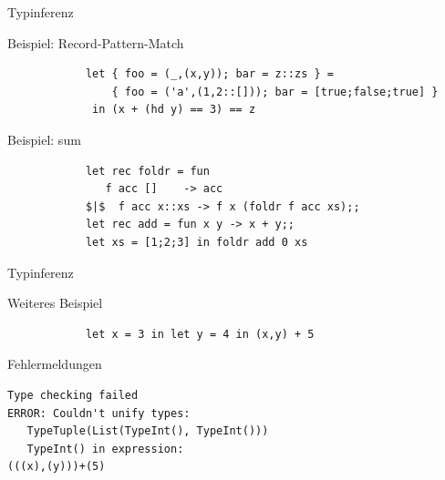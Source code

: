 \documentclass[hyperref={pdfpagelabels=false}]{beamer}
\begin{document}
\begin{frame}[fragile]{Typinferenz}
  \begin{block}{Beispiel: Record-Pattern-Match}
      \begin{verbatim}
            let { foo = (_,(x,y)); bar = z::zs } =
                { foo = ('a',(1,2::[])); bar = [true;false;true] }
             in (x + (hd y) == 3) == z
      \end{verbatim}
  \end{block}
  \begin{block}{Beispiel: sum}
      \begin{verbatim}
            let rec foldr = fun
               f acc []    -> acc
            $|$  f acc x::xs -> f x (foldr f acc xs);;
            let rec add = fun x y -> x + y;;
            let xs = [1;2;3] in foldr add 0 xs
      \end{verbatim}
  \end{block}
\end{frame}

\begin{frame}[fragile]{Typinferenz}
  \begin{block}{Weiteres Beispiel}
      \begin{verbatim}
            let x = 3 in let y = 4 in (x,y) + 5
      \end{verbatim}
  \end{block}
  \begin{alertblock}{Fehlermeldungen}
  \begin{verbatim}
Type checking failed
ERROR: Couldn't unify types: 
   TypeTuple(List(TypeInt(), TypeInt()))
   TypeInt() in expression: 
(((x),(y)))+(5)
  \end{verbatim}
  \end{alertblock}
\end{frame}
\end{document}
